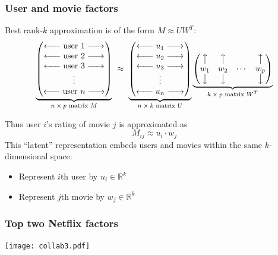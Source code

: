 \documentclass[smaller]{beamer}
\def\R{{\mathbb R}}
\def\darkred{\color{red!70!black}}
\def\darkgreen{\color{green!60!black}}
\def\vone{{\vskip.1in}}
\def\R{{\mathbb R}}
\begin{document}
\begin{frame}
\frametitle{User and movie factors}

Best rank-$k$ approximation is of the form $M \approx U W^T$:
$$
\underbrace{\begin{pmatrix} 
\xleftarrow{\hspace*{.5cm}} \text{user 1} \xrightarrow{\hspace*{.5cm}} \\
\xleftarrow{\hspace*{.5cm}} \text{user 2} \xrightarrow{\hspace*{.5cm}} \\
\xleftarrow{\hspace*{.5cm}} \text{user 3} \xrightarrow{\hspace*{.5cm}} \\
\vdots \\
\xleftarrow{\hspace*{.5cm}} \text{user $n$} \xrightarrow{\hspace*{.5cm}} 
\end{pmatrix}}_{\text{$n \times p$ matrix $M$}}
\ \approx \ 
\underbrace{\begin{pmatrix}
\xleftarrow{\hspace*{0.5cm}} u_1 \xrightarrow{\hspace*{0.5cm}} \\
\xleftarrow{\hspace*{0.5cm}} u_2 \xrightarrow{\hspace*{0.5cm}} \\
\xleftarrow{\hspace*{0.5cm}} u_3 \xrightarrow{\hspace*{0.5cm}} \\
\vdots \\
\xleftarrow{\hspace*{0.5cm}} u_n \xrightarrow{\hspace*{0.5cm}} 
\end{pmatrix}}_{\text{$n \times k$ matrix $U$}}
\underbrace{\begin{pmatrix} 
\big\uparrow   & \big\uparrow  &        & \big\uparrow \\
w_1        & w_2       & \cdots & w_p       \\
\big\downarrow & \big\downarrow &       & \big\downarrow
\end{pmatrix}}_{\text{$k \times p$ matrix $W^T$}}
$$

\pause\vone
{\darkred Thus user $i$'s rating of movie $j$ is approximated as
$$ M_{ij} \approx u_i \cdot w_j $$}
\pause
{\darkgreen This ``latent'' representation embeds users and movies within the same $k$-dimensional space:}
\begin{itemize}
\item {\darkgreen Represent $i$th user by $u_i \in \R^k$}
\item {\darkgreen Represent $j$th movie by $w_j \in \R^k$}
\end{itemize}

\end{frame}

\begin{frame}
\frametitle{Top two Netflix factors}

\begin{center}
\texttt{[image: collab3.pdf]}
\end{center}

\end{frame}
\end{document}
